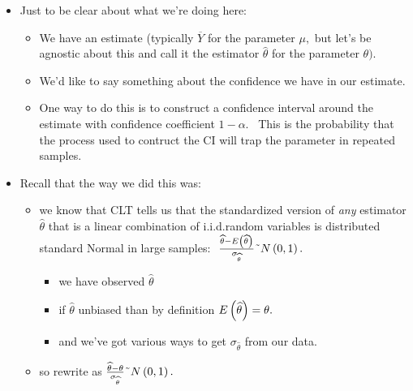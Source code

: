 \documentclass[11pt]{article}
\begin{document}
\begin{itemize}
\item Just to be clear about what we're doing here:

\begin{itemize}
\item We have an estimate (typically $\overline{Y}$ for the parameter $\mu ,$
but let's be agnostic about this and call it the estimator $\widehat{\theta }
$ for the parameter $\theta ).$

\item We'd like to say something about the confidence we have in our
estimate.

\item One way to do this is to construct a confidence interval around the
estimate with confidence coefficient $1-\alpha .$ \ This is the probability
that the process used to contruct the CI will trap the parameter in repeated
samples.
\end{itemize}

\item Recall that the way we did this was:

\begin{itemize}
\item we know that CLT tells us that the standardized version of \textit{any 
}estimator $\widehat{\theta }$ that is a linear combination of i.i.d.random
variables is distributed standard Normal in large samples: $\ \frac{\widehat{%
\theta }-E\left( \widehat{\theta }\right) }{\sigma _{\widehat{\theta }}}%
\symbol{126}N\left( 0,1\right) .$

\begin{itemize}
\item we have observed $\widehat{\theta }$

\item if $\widehat{\theta }$ unbiased than by definition $E\left( \widehat{%
\theta }\right) =\theta .$

\item and we've got various ways to get $\sigma _{\widehat{\theta }}$ from
our data.
\end{itemize}

\item so rewrite as $\frac{\widehat{\theta }-\theta }{\sigma _{\widehat{%
\theta }}}\symbol{126}N\left( 0,1\right) .$


\end{itemize}
\end{itemize}
\end{document}
